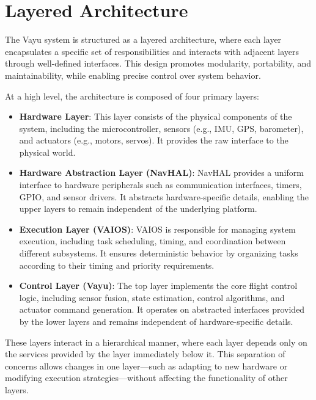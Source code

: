 \section{Layered Architecture}
\label{sec:layered_arch}

The Vayu system is structured as a layered architecture, where each layer encapsulates a specific set of responsibilities and interacts with adjacent layers through well-defined interfaces. This design promotes modularity, portability, and maintainability, while enabling precise control over system behavior.

At a high level, the architecture is composed of four primary layers:

\begin{itemize}
    \item \textbf{Hardware Layer}:  
    This layer consists of the physical components of the system, including the microcontroller, sensors (e.g., IMU, GPS, barometer), and actuators (e.g., motors, servos). It provides the raw interface to the physical world.

    \item \textbf{Hardware Abstraction Layer (NavHAL)}:  
    NavHAL provides a uniform interface to hardware peripherals such as communication interfaces, timers, GPIO, and sensor drivers. It abstracts hardware-specific details, enabling the upper layers to remain independent of the underlying platform.

    \item \textbf{Execution Layer (VAIOS)}:  
    VAIOS is responsible for managing system execution, including task scheduling, timing, and coordination between different subsystems. It ensures deterministic behavior by organizing tasks according to their timing and priority requirements.

    \item \textbf{Control Layer (Vayu)}:  
    The top layer implements the core flight control logic, including sensor fusion, state estimation, control algorithms, and actuator command generation. It operates on abstracted interfaces provided by the lower layers and remains independent of hardware-specific details.
\end{itemize}

These layers interact in a hierarchical manner, where each layer depends only on the services provided by the layer immediately below it. This separation of concerns allows changes in one layer—such as adapting to new hardware or modifying execution strategies—without affecting the functionality of other layers.

